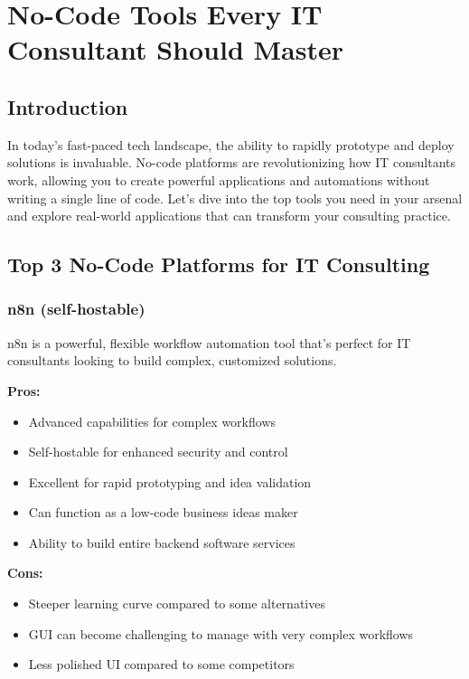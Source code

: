 \chapter{No-Code Tools Every IT Consultant Should Master}


\section{Introduction}

In today's fast-paced tech landscape, the ability to rapidly prototype and deploy solutions is invaluable. No-code platforms are revolutionizing how IT consultants work, allowing you to create powerful applications and automations without writing a single line of code. Let's dive into the top tools you need in your arsenal and explore real-world applications that can transform your consulting practice.


\section{Top 3 No-Code Platforms for IT Consulting}

\subsection{n8n (self-hostable)}

n8n is a powerful, flexible workflow automation tool that's perfect for IT consultants looking to build complex, customized solutions.

\textbf{Pros:}
\begin{itemize}
    \item Advanced capabilities for complex workflows
    \item Self-hostable for enhanced security and control
    \item Excellent for rapid prototyping and idea validation
    \item Can function as a low-code business ideas maker
    \item Ability to build entire backend software services
\end{itemize}

\textbf{Cons:}
\begin{itemize}
    \item Steeper learning curve compared to some alternatives
    \item GUI can become challenging to manage with very complex workflows
    \item Less polished UI compared to some competitors
\end{itemize}

